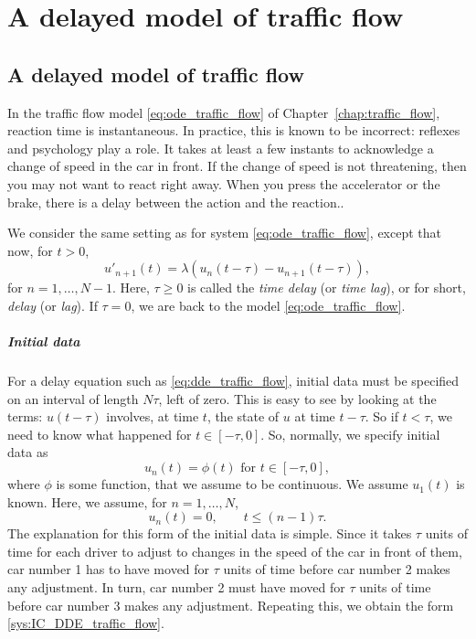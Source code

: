 \chapter{A delayed model of traffic flow}
\label{chap:dde_traffic}


\section{A delayed model of traffic flow}
In the traffic flow model \eqref{eq:ode_traffic_flow} of Chapter~\ref{chap:traffic_flow}, reaction time is instantaneous.
In practice, this is known to be incorrect: reflexes and psychology play a role.
It takes at least a few instants to acknowledge a change of speed in the car in front.
If the change of speed is not threatening, then you may not want to react right away.
When you press the accelerator or the brake, there is a delay between the action and the reaction..

We consider the same setting as for system \eqref{eq:ode_traffic_flow}, except that now, for $t>0$,
\begin{equation}\label{eq:dde_traffic_flow}
u'_{n+1}(t)=\lambda(u_n(t-\tau)-u_{n+1}(t-\tau)),
\end{equation}
for $n=1,\ldots,N-1$. Here, $\tau\geq 0$ is called the \emph{time delay} (or \emph{time lag}), or for short, \emph{delay} (or \emph{lag}).
If $\tau=0$, we are back to the model \eqref{eq:ode_traffic_flow}.

\paragraph{Initial data}
For a delay equation such as \eqref{eq:dde_traffic_flow}, initial data must be specified on an interval of length $N\tau$, left of zero.
\vskip0.5cm
This is easy to see by looking at the terms: $u(t-\tau)$ involves, at time $t$, the state of $u$ at time $t-\tau$. So if $t<\tau$, we need to know what happened for $t\in[-\tau,0]$.
So, normally, we specify initial data as
\[
u_n(t)=\phi(t)\textrm{ for }t\in[-\tau,0],
\]
where $\phi$ is some function, that we assume to be continuous. We assume $u_1(t)$ is known.
Here, we assume, for $n=1,\ldots,N$,
\begin{equation}\label{sys:IC_DDE_traffic_flow}
u_n(t)=0,\qquad t\leq (n-1)\tau.
\end{equation}
The explanation for this form of the initial data is simple. Since it takes $\tau$ units of time for each driver to adjust to changes in the speed of the car in front of them, car number 1 has to have moved for $\tau$ units of time before car number 2 makes any adjustment. In turn, car number 2 must have moved for $\tau$ units of time before car number 3 makes any adjustment. Repeating this, we obtain the form \eqref{sys:IC_DDE_traffic_flow}.

